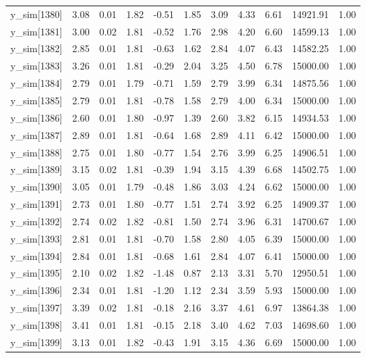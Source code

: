 \begin{table}[ht]
\begin{tabular}{rrrrrrrrrrr}
  y\_sim[1380] & 3.08 & 0.01 & 1.82 & -0.51 & 1.85 & 3.09 & 4.33 & 6.61 & 14921.91 & 1.00 \\ 
  y\_sim[1381] & 3.00 & 0.02 & 1.81 & -0.52 & 1.76 & 2.98 & 4.20 & 6.60 & 14599.13 & 1.00 \\ 
  y\_sim[1382] & 2.85 & 0.01 & 1.81 & -0.63 & 1.62 & 2.84 & 4.07 & 6.43 & 14582.25 & 1.00 \\ 
  y\_sim[1383] & 3.26 & 0.01 & 1.81 & -0.29 & 2.04 & 3.25 & 4.50 & 6.78 & 15000.00 & 1.00 \\ 
  y\_sim[1384] & 2.79 & 0.01 & 1.79 & -0.71 & 1.59 & 2.79 & 3.99 & 6.34 & 14875.56 & 1.00 \\ 
  y\_sim[1385] & 2.79 & 0.01 & 1.81 & -0.78 & 1.58 & 2.79 & 4.00 & 6.34 & 15000.00 & 1.00 \\ 
  y\_sim[1386] & 2.60 & 0.01 & 1.80 & -0.97 & 1.39 & 2.60 & 3.82 & 6.15 & 14934.53 & 1.00 \\ 
  y\_sim[1387] & 2.89 & 0.01 & 1.81 & -0.64 & 1.68 & 2.89 & 4.11 & 6.42 & 15000.00 & 1.00 \\ 
  y\_sim[1388] & 2.75 & 0.01 & 1.80 & -0.77 & 1.54 & 2.76 & 3.99 & 6.25 & 14906.51 & 1.00 \\ 
  y\_sim[1389] & 3.15 & 0.02 & 1.81 & -0.39 & 1.94 & 3.15 & 4.39 & 6.68 & 14502.75 & 1.00 \\ 
  y\_sim[1390] & 3.05 & 0.01 & 1.79 & -0.48 & 1.86 & 3.03 & 4.24 & 6.62 & 15000.00 & 1.00 \\ 
  y\_sim[1391] & 2.73 & 0.01 & 1.80 & -0.77 & 1.51 & 2.74 & 3.92 & 6.25 & 14909.37 & 1.00 \\ 
  y\_sim[1392] & 2.74 & 0.02 & 1.82 & -0.81 & 1.50 & 2.74 & 3.96 & 6.31 & 14700.67 & 1.00 \\ 
  y\_sim[1393] & 2.81 & 0.01 & 1.81 & -0.70 & 1.58 & 2.80 & 4.05 & 6.39 & 15000.00 & 1.00 \\ 
  y\_sim[1394] & 2.84 & 0.01 & 1.81 & -0.68 & 1.61 & 2.84 & 4.07 & 6.41 & 15000.00 & 1.00 \\ 
  y\_sim[1395] & 2.10 & 0.02 & 1.82 & -1.48 & 0.87 & 2.13 & 3.31 & 5.70 & 12950.51 & 1.00 \\ 
  y\_sim[1396] & 2.34 & 0.01 & 1.81 & -1.20 & 1.12 & 2.34 & 3.59 & 5.93 & 15000.00 & 1.00 \\ 
  y\_sim[1397] & 3.39 & 0.02 & 1.81 & -0.18 & 2.16 & 3.37 & 4.61 & 6.97 & 13864.38 & 1.00 \\ 
  y\_sim[1398] & 3.41 & 0.01 & 1.81 & -0.15 & 2.18 & 3.40 & 4.62 & 7.03 & 14698.60 & 1.00 \\ 
  y\_sim[1399] & 3.13 & 0.01 & 1.82 & -0.43 & 1.91 & 3.15 & 4.36 & 6.69 & 15000.00 & 1.00 \\ 

\end{tabular}
\end{table}
